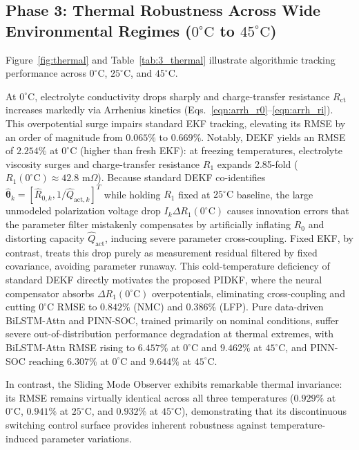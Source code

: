 \documentclass[preprint,12pt]{elsarticle}
\begin{document}
\subsection[Phase 3: Thermal Robustness Across Wide Environmental Regimes (0 to 45 deg C)]{Phase 3: Thermal Robustness Across Wide Environmental Regimes ($0^\circ\text{C}$ to $45^\circ\text{C}$)}
Figure~\ref{fig:thermal} and Table~\ref{tab:3_thermal} illustrate algorithmic tracking performance across $0^\circ\text{C}$, $25^\circ\text{C}$, and $45^\circ\text{C}$.

At $0^\circ\text{C}$, electrolyte conductivity drops sharply and charge-transfer resistance $R_{\text{ct}}$ increases markedly via Arrhenius kinetics (Eqs.~\eqref{eqn:arrh_r0}--\eqref{eqn:arrh_ri}). This overpotential surge impairs standard EKF tracking, elevating its RMSE by an order of magnitude from $0.065\%$ to $0.669\%$. Notably, DEKF yields an RMSE of $2.254\%$ at $0^\circ\text{C}$ (higher than fresh EKF): at freezing temperatures, electrolyte viscosity surges and charge-transfer resistance $R_1$ expands 2.85-fold ($R_1(0^\circ\text{C}) \approx 42.8\text{ m}\Omega$). Because standard DEKF co-identifies $\hat{\boldsymbol{\theta}}_k = [\hat{R}_{0,k}, 1/\hat{Q}_{\text{act},k}]^T$ while holding $R_1$ fixed at $25^\circ\text{C}$ baseline, the large unmodeled polarization voltage drop $I_k \Delta R_1(0^\circ\text{C})$ causes innovation errors that the parameter filter mistakenly compensates by artificially inflating $\hat{R}_0$ and distorting capacity $\hat{Q}_{\text{act}}$, inducing severe parameter cross-coupling. Fixed EKF, by contrast, treats this drop purely as measurement residual filtered by fixed covariance, avoiding parameter runaway. This cold-temperature deficiency of standard DEKF directly motivates the proposed PIDKF, where the neural compensator absorbs $\Delta R_1(0^\circ\text{C})$ overpotentials, eliminating cross-coupling and cutting $0^\circ\text{C}$ RMSE to $0.842\%$ (NMC) and $0.386\%$ (LFP). Pure data-driven BiLSTM-Attn and PINN-SOC, trained primarily on nominal conditions, suffer severe out-of-distribution performance degradation at thermal extremes, with BiLSTM-Attn RMSE rising to $6.457\%$ at $0^\circ\text{C}$ and $9.462\%$ at $45^\circ\text{C}$, and PINN-SOC reaching $6.307\%$ at $0^\circ\text{C}$ and $9.644\%$ at $45^\circ\text{C}$.

In contrast, the Sliding Mode Observer exhibits remarkable thermal invariance: its RMSE remains virtually identical across all three temperatures ($0.929\%$ at $0^\circ\text{C}$, $0.941\%$ at $25^\circ\text{C}$, and $0.932\%$ at $45^\circ\text{C}$), demonstrating that its discontinuous switching control surface provides inherent robustness against temperature-induced parameter variations.
\end{document}
